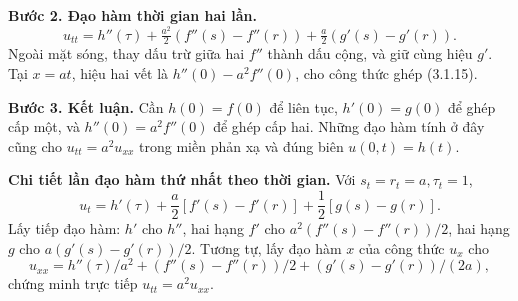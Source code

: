 \documentclass[10pt,a4paper]{article}
\begin{document}
\textbf{Bước 2. Đạo hàm thời gian hai lần.}
\[u_{tt}=h''(\tau)+\tfrac{a^2}2(f''(s)-f''(r))+\tfrac a2(g'(s)-g'(r)).\]
Ngoài mặt sóng, thay dấu trừ giữa hai $f''$ thành dấu cộng, và giữ cùng hiệu $g'$. Tại $x=at$, hiệu hai vết là $h''(0)-a^2f''(0)$, cho công thức ghép (3.1.15).

\textbf{Bước 3. Kết luận.} Cần $h(0)=f(0)$ để liên tục, $h'(0)=g(0)$ để ghép cấp một, và $h''(0)=a^2f''(0)$ để ghép cấp hai. Những đạo hàm tính ở đây cũng cho $u_{tt}=a^2u_{xx}$ trong miền phản xạ và đúng biên $u(0,t)=h(t)$.

\textbf{Chi tiết lần đạo hàm thứ nhất theo thời gian.} Với $s_t=r_t=a,\tau_t=1$,
\[u_t=h'(\tau)+\frac a2[f'(s)-f'(r)]+\frac12[g(s)-g(r)].\]
Lấy tiếp đạo hàm: $h'$ cho $h''$, hai hạng $f'$ cho $a^2(f''(s)-f''(r))/2$, hai hạng $g$ cho $a(g'(s)-g'(r))/2$. Tương tự, lấy đạo hàm $x$ của công thức $u_x$ cho
\[u_{xx}=h''(\tau)/a^2+(f''(s)-f''(r))/2+(g'(s)-g'(r))/(2a),\]
chứng minh trực tiếp $u_{tt}=a^2u_{xx}$.
\end{document}
